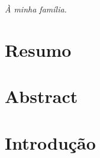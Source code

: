 \documentclass[a4paper,12pt]{report}
\begin{document}
	
	
	\newpage
	
	\thispagestyle{empty}
	\vfill
	\begin{center}
		\textit{À minha família.}
	\end{center}
	\vfill
	
	\newpage
	
	\chapter*{}
	
	
	
	\thispagestyle{empty}
	\newpage
	
	
	\chapter*{\centering Resumo}
	
	
	
	
	\thispagestyle{empty} 
	
	\newpage
	
	\chapter*{\centering Abstract}
	
	
	
	
	\thispagestyle{empty} 
	\newpage
	
	
	\begin{titlepage}
		\tableofcontents
		\thispagestyle{empty}
	\end{titlepage}
	
	\newpage
	
	
	\chapter*{Introdução}
	
	
	\newpage
	
	
\end{document}
